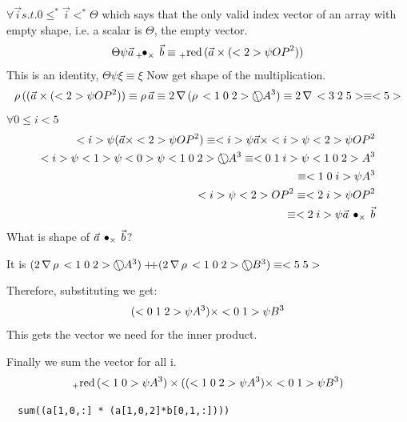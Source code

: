 \documentclass[a4paper,12pt]{article}
\begin{document}
$\forall \vec i s.t. 0  \leq^* \vec i <^* \Theta $ which says that the only valid index vector of an array with empty shape, i.e. a scalar is $\Theta$, the empty vector. 
\begin{eqnarray}
\Theta \psi \vec a \,{}_{+}\!\!\bullet_{\times}\, \vec b \equiv {}_{+}\!\operatorname{red}\, (\vec a \times (<2> \psi {OP}^2))
\end{eqnarray}
This is an identity, $\Theta \psi \xi \equiv \xi$ Now get shape of the multiplication.
\begin{eqnarray}
\rho\, ((\vec a \times (<2> \psi {OP}^2)) \equiv \rho\, \vec a \equiv  2 \,\nabla\, (\rho\, < 1\;0\;2> \bigcirc\!\!\!\!\!\backslash\; A^3 )\equiv 2 \,\nabla\, <3\;2\;5> \equiv <5>
\end{eqnarray}
$\forall 0 \leq i <5 $
\begin{eqnarray}
<i> \psi(\vec a \times <2>\psi {OP}^2) \equiv <i> \psi \vec a \times <i> \psi <2> \psi {OP}^2 \\
<i> \psi <1> \psi <0> \psi <1\;0\;2> \bigcirc\!\!\!\!\!\backslash\; A^3 \equiv <0\;1\;i> \psi <1\;0\;2> A^3\\
\equiv <1\;0\;i> \psi   A^3\\
<i> \psi  <2> {OP}^2 \equiv <2\;i> \psi {OP}^2\\
\equiv <2\;i> \psi {\vec a \,\bullet_{\times}\, \vec b}
\end{eqnarray}
What is shape of $\vec a \,\bullet_{\times}\, \vec b $? 

It is $(2\drop \shape \vccc102\transpose A^3) \cat (2\drop \shape \vccc102 \transpose B^3) \equiv \vcc55$

Therefore, substituting we get:
\[ (<0\;1\;2> \psi A^3) \times <0\;1> \psi B^3\]
This gets the vector we need for the inner product. 

Finally we sum the vector for all i.
\[ {}_{+}\!\operatorname{red}\, (<1\;0>\psi A^3) \times(( <1\;0\;2> \psi A^3)\times <0\;1> \psi B^3)\]
\begin{verbatim}
  sum((a[1,0,:] * (a[1,0,2]*b[0,1,:])))
\end{verbatim}



\end{document}
